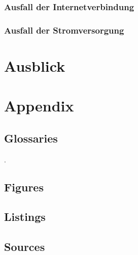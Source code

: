 \documentclass[12pt]{article}
\begin{document}
\subsubsection{Ausfall der Internetverbindung}
%

\subsubsection{Ausfall der Stromversorgung}
%

\newpage %
\section{Ausblick}
%

\newpage %
\cfoot{}
\section{Appendix}
\label{sec:appenix}

\subsection{Glossaries}
\label{subsec:glossaries}
\begingroup
\renewcommand{\section}[2]{}
\printglossary[style=tree]
\endgroup
\newpage

{\small\color{white}.}
\vspace{-2cm}
\subsection{Figures}
\label{subsec:figures}
\begingroup
\renewcommand{\section}[2]{}
\listoffigures
\endgroup

\subsection{Listings}
\label{subsec:listings}
\begingroup
\renewcommand{\section}[2]{}
\lstlistoflistings
\endgroup

\subsection{Sources}
\label{subsec:sources}
\begingroup
\renewcommand{\section}[2]{}


\endgroup
\end{document}
